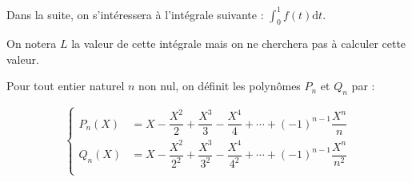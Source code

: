 \documentclass[a4paper,french,11pt,twoside]{VcCours}
\newcommand{\dt}{\text{d}t}
\begin{document}
\medskip

\noindent Dans la suite, on s'intéressera à l'intégrale suivante : $%
{\int_{0}^{1}}
f\left(  t\right)  \dt.$

\medskip

\noindent On notera $L$ la valeur de cette intégrale mais on ne cherchera pas à calculer
cette valeur.

\medskip

\noindent Pour tout entier naturel $n$ non nul, on définit les polyn\^omes $P_n$ et $Q_n$ par :

$$ \left\lbrace \begin{array}{ll}
P_{n}\left(  X\right)  & =X-\dfrac{X^{2}}{2}+\dfrac{X^{3}}{3}-\dfrac{X^{4}}
{4}+\cdots+\left(  -1\right)  ^{n-1}\dfrac{X^{n}}{n} \\[0.3cm]
Q_{n}\left(  X\right)  &=X-\dfrac{X^{2}}{2^{2}}+\dfrac{X^{3}}{3^{2}}
-\dfrac{X^{4}}{4^{2}}+\cdots+\left(  -1\right)  ^{n-1}\dfrac{X^{n}}{n^{2}}\\
\end{array}\right.$$

\medskip
\end{document}
